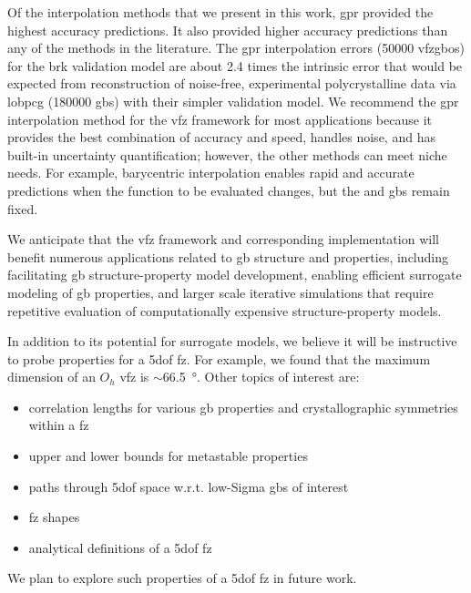 \documentclass[final,twocolumn,12pt]{elsarticle}
\begin{document}
Of the interpolation methods that we present in this work, \Gls{gpr} provided the highest accuracy predictions. It also provided higher accuracy predictions than any of the methods in the literature. The \gls{gpr} interpolation errors (\num{50000} \glspl{vfzgbo}) for the \gls{brk} validation model are about \num{2.4} times the intrinsic error that would be expected from reconstruction of noise-free, experimental polycrystalline data via \gls{lobpcg} \cite{shenDeterminingGrainBoundary2019} (\num{180000} \glspl{gb}) with their simpler validation model. %
We recommend the \gls{gpr} interpolation method for the \gls{vfz} framework for most applications because it provides the best combination of accuracy and speed, handles \inpt{} noise, and has built-in uncertainty quantification; however, the other methods can meet niche needs. For example, barycentric interpolation enables rapid and accurate predictions when the function to be evaluated changes, but the \inpt{} and \outpt{} \glspl{gb} remain fixed.

We anticipate that the \gls{vfz} framework and corresponding implementation will benefit numerous applications related to \gls{gb} structure and properties, including facilitating \gls{gb} structure-property model development, enabling efficient surrogate modeling of \gls{gb} properties, and larger scale iterative simulations that require repetitive evaluation of computationally expensive structure-property models.

In addition to its potential for surrogate models, we believe it will be instructive to probe properties for a \gls{5dof} \gls{fz}. For example, we found that the maximum dimension of an $O_h$ \gls{vfz} is $\sim$\SI{66.5}{\degree}. Other topics of interest are:
\begin{itemize}
    \item correlation lengths for various \gls{gb} properties and crystallographic symmetries within a \gls{fz}
    \item upper and lower bounds for metastable properties
    \item paths through \gls{5dof} space w.r.t. low-Sigma \glspl{gb} of interest
    \item \gls{fz} shapes
    \item analytical definitions of a \gls{5dof} \gls{fz}
\end{itemize}
We plan to explore such properties of a \gls{5dof} \gls{fz} in future work.
\end{document}
